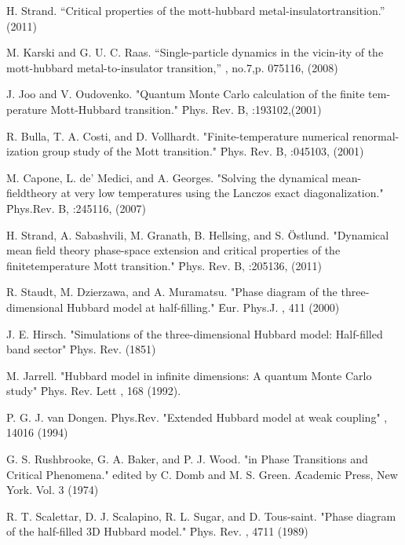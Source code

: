 \begin{thebibliography}{4}
{H. Strand. “Critical properties of the mott-hubbard metal-insulatortransition.” (2011)}

{M. Karski and G. U. C. Raas. “Single-particle dynamics in the vicin-ity of the mott-hubbard metal-to-insulator transition,” , no.7,p. 075116, (2008)}

{ J. Joo and V. Oudovenko. "Quantum Monte Carlo calculation of the finite tem-perature Mott-Hubbard transition." \f{Phys. Rev. B},  :193102,(2001) }

{R. Bulla, T. A. Costi, and D. Vollhardt. "Finite-temperature numerical renormal-ization group study of the Mott transition." \f{Phys. Rev. B}, :045103, (2001)}

{M. Capone, L. de’ Medici, and A. Georges.  "Solving the dynamical mean-fieldtheory at very low temperatures using the Lanczos exact diagonalization." \f{Phys.Rev. B}, :245116, (2007)}

{H. Strand, A. Sabashvili, M. Granath, B. Hellsing, and S. Östlund.  "Dynamical mean field theory phase-space extension and critical properties of the finitetemperature Mott transition." \f{Phys. Rev. B}, :205136, (2011)}

{ R. Staudt, M. Dzierzawa, and A. Muramatsu. "Phase diagram of the three-dimensional Hubbard model at half-filling." \f{Eur. Phys.J.} , 411 (2000) }

{ J. E. Hirsch. "Simulations of the three-dimensional Hubbard model: Half-filled band sector" \f{Phys. Rev.}  (1851) }

{ M. Jarrell. "Hubbard model in infinite dimensions: A quantum Monte Carlo study" \f{Phys. Rev. Lett} , 168 (1992). }

{ P. G. J. van Dongen. \f{Phys.Rev}. "Extended Hubbard model at weak coupling" , 14016 (1994) }

{ G. S. Rushbrooke, G. A. Baker, and P. J. Wood. "in Phase Transitions and Critical Phenomena." edited by C. Domb and M. S. Green. \f{Academic Press, New York.} Vol. 3 (1974) }

{ R. T. Scalettar, D. J. Scalapino, R. L. Sugar, and D. Tous-saint. "Phase diagram of the half-filled 3D Hubbard model." \f{Phys. Rev}. , 4711 (1989) }


\end{thebibliography}
